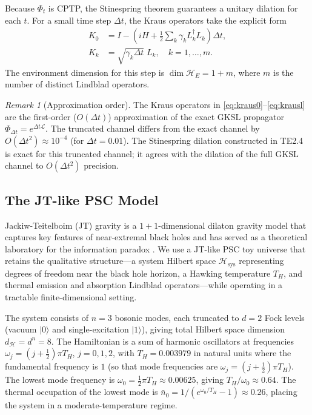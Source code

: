 \documentclass[11pt,twocolumn]{article}
\theoremstyle{remark}
\newtheorem{remark}[theorem]{Remark}
\begin{document}
Because $\Phi_t$ is CPTP, the Stinespring theorem guarantees a unitary
dilation for each $t$. For a small time step $\Delta t$, the Kraus
operators take the explicit form
\begin{align}
  K_0 &= I - \left(iH + \tfrac{1}{2}\sum_k \gamma_k L_k^\dagger L_k\right)\Delta t,
  \label{eq:kraus0}\\
  K_k &= \sqrt{\gamma_k \Delta t}\; L_k, \quad k = 1,\ldots,m.
  \label{eq:krausl}
\end{align}
The environment dimension for this step is $\dim\mathcal{H}_E = 1 + m$,
where $m$ is the number of distinct Lindblad operators.

\begin{remark}[Approximation order]
The Kraus operators in \eqref{eq:kraus0}--\eqref{eq:krausl} are the
first-order ($O(\Delta t)$) approximation of the exact GKSL propagator
$\Phi_{\Delta t} = e^{\Delta t \mathcal{L}}$. The truncated channel
differs from the exact channel by $O(\Delta t^2) \approx 10^{-4}$ (for
$\Delta t = 0.01$). The Stinespring dilation constructed in TE2.4 is exact
for this truncated channel; it agrees with the dilation of the full GKSL
channel to $O(\Delta t^2)$ precision.
\end{remark}

\subsection{The JT-like PSC Model}
\label{sec:model}

Jackiw-Teitelboim (JT) gravity \cite{JackiwTeitelboim1985,Teitelboim1983}
is a $1{+}1$-dimensional dilaton gravity model that captures key features
of near-extremal black holes and has served as a theoretical laboratory
for the information paradox \cite{Penington2020}. We use a JT-like PSC
toy universe that retains the qualitative structure---a system Hilbert
space $\mathcal{H}_{\mathrm{sys}}$ representing degrees of freedom near
the black hole horizon, a Hawking temperature $T_H$, and thermal emission
and absorption Lindblad operators---while operating in a tractable
finite-dimensional setting.

The system consists of $n = 3$ bosonic modes, each truncated to
$d = 2$ Fock levels (vacuum $|0\rangle$ and single-excitation $|1\rangle$),
giving total Hilbert space dimension $d_{\mathcal{H}} = d^n = 8$.
The Hamiltonian is a sum of harmonic oscillators at frequencies
$\omega_j = (j + \tfrac{1}{2})\pi T_H$, $j = 0,1,2$, with $T_H =
0.003979$ in natural units where the fundamental frequency is $1$ (so
that mode frequencies are $\omega_j = (j+\tfrac{1}{2})\pi T_H$). The
lowest mode frequency is $\omega_0 = \tfrac{1}{2}\pi T_H \approx 0.00625$,
giving $T_H/\omega_0 \approx 0.64$. The thermal occupation of the lowest
mode is $\bar{n}_0 = 1/(e^{\omega_0/T_H}-1) \approx 0.26$, placing the
system in a moderate-temperature regime.
\end{document}
